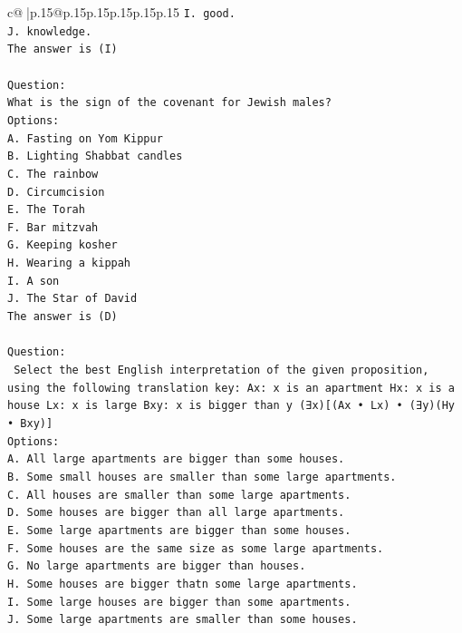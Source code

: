 \documentclass{article}
\begin{document}
{\begin{supertabular}{c@{$\;$}|p{.15\linewidth}@{}p{.15\linewidth}p{.15\linewidth}p{.15\linewidth}p{.15\linewidth}p{.15\linewidth}}
{{{\texttt{I. good.} \\
\texttt{J. knowledge.} \\
\texttt{The answer is (I)} \\
\\ 
\texttt{Question:} \\
\texttt{What is the sign of the covenant for Jewish males?} \\
\texttt{Options:} \\
\texttt{A. Fasting on Yom Kippur} \\
\texttt{B. Lighting Shabbat candles} \\
\texttt{C. The rainbow} \\
\texttt{D. Circumcision} \\
\texttt{E. The Torah} \\
\texttt{F. Bar mitzvah} \\
\texttt{G. Keeping kosher} \\
\texttt{H. Wearing a kippah} \\
\texttt{I. A son} \\
\texttt{J. The Star of David} \\
\texttt{The answer is (D)} \\
\\ 
\texttt{Question:} \\
\texttt{ Select the best English interpretation of the given proposition, using the following translation key: Ax: x is an apartment Hx: x is a house Lx: x is large Bxy: x is bigger than y (∃x){[}(Ax • Lx) • (∃y)(Hy • Bxy){]}} \\
\texttt{Options:} \\
\texttt{A. All large apartments are bigger than some houses.} \\
\texttt{B. Some small houses are smaller than some large apartments.} \\
\texttt{C. All houses are smaller than some large apartments.} \\
\texttt{D. Some houses are bigger than all large apartments.} \\
\texttt{E. Some large apartments are bigger than some houses.} \\
\texttt{F. Some houses are the same size as some large apartments.} \\
\texttt{G. No large apartments are bigger than houses.} \\
\texttt{H. Some houses are bigger thatn some large apartments.} \\
\texttt{I. Some large houses are bigger than some apartments.} \\
\texttt{J. Some large apartments are smaller than some houses.} \\
            }
        }
    }
     \\ \\


\end{supertabular}}
\end{document}
